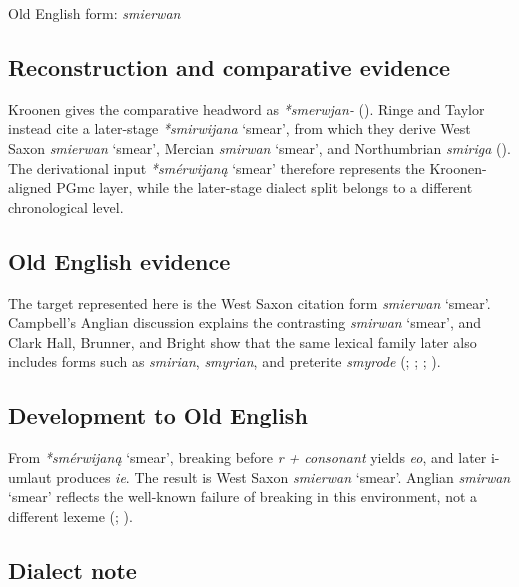 \documentclass[
  british,
  a4paper,
  openany]{book}
\providecommand{\Recon}[1]{\emph{*#1}}
{\catcode`→=\active \global\def→{\ensuremath{\rightarrow}}}
\providecommand{\Recon}[1]{\emph{*#1}}
{\catcode`→=\active \global\def→{\ensuremath{\rightarrow}}}
\begin{document}
Old English form: \emph{smierwan}

\subsection{Reconstruction and comparative
evidence}\label{reconstruction-and-comparative-evidence-47}

Kroonen gives the comparative headword as \emph{*smerwjan-}
(). Ringe and Taylor instead
cite a later-stage \Recon{smirwijana} `smear', from which they derive
West Saxon {\emph{smierwan}} `smear', Mercian {\emph{smirwan}} `smear',
and Northumbrian \emph{smiriga} (). The derivational input \Recon{smérwijaną} `smear'
therefore represents the Kroonen-aligned PGmc layer, while the
later-stage dialect split belongs to a different chronological level.

\subsection{Old English evidence}\label{old-english-evidence-47}

The target represented here is the West Saxon citation form
{\emph{smierwan}} `smear'. Campbell's Anglian discussion explains the
contrasting {\emph{smirwan}} `smear', and Clark Hall, Brunner, and
Bright show that the same lexical family later also includes forms such
as \emph{smirian}, \emph{smyrian}, and preterite \emph{smyrode}
(;
;
;
).

\subsection{Development to Old
English}\label{development-to-old-english-47}

From \Recon{smérwijaną} `smear', breaking before \emph{r + consonant}
yields \emph{eo}, and later i-umlaut produces \emph{ie}. The result is
West Saxon {\emph{smierwan}} `smear'. Anglian {\emph{smirwan}} `smear'
reflects the well-known failure of breaking in this environment, not a
different lexeme (;
).

\subsection{Dialect note}\label{dialect-note-5}
\end{document}
